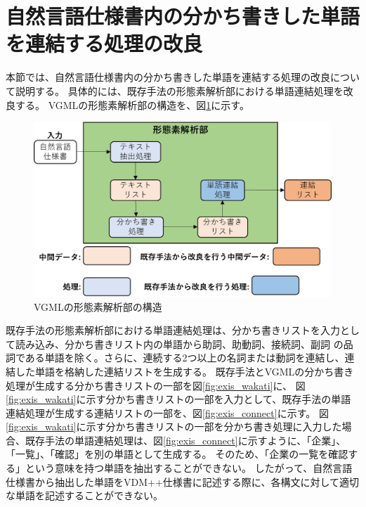 \section{自然言語仕様書内の分かち書きした単語を連結する処理の改良}
本節では、自然言語仕様書内の分かち書きした単語を連結する処理の改良について説明する。
具体的には、既存手法の形態素解析部における単語連結処理を改良する。
VGMLの形態素解析部の構造を、図\ref{fig:vgml_mor_structure}に示す。

\begin{figure}[t]
    \begin{center}
        \includegraphics[width=1.0\columnwidth]{image/vgml_mor_structure.png}
        \caption{VGMLの形態素解析部の構造}
        \label{fig:vgml_mor_structure}
    \end{center}
\end{figure}

既存手法の形態素解析部における単語連結処理は、分かち書きリストを入力として読み込み、分かち書きリスト内の単語から助詞、助動詞、接続詞、副詞
の品詞である単語を除く。さらに、連続する2つ以上の名詞または動詞を連結し、連結した単語を格納した連結リストを生成する。
既存手法とVGMLの分かち書き処理が生成する分かち書きリストの一部を図\ref{fig:exis_wakati}に、
図\ref{fig:exis_wakati}に示す分かち書きリストの一部を入力として、既存手法の単語連結処理が生成する連結リストの一部を、図\ref{fig:exis_connect}に示す。
図\ref{fig:exis_wakati}に示す分かち書きリストの一部を分かち書き処理に入力した場合、既存手法の単語連結処理は、図\ref{fig:exis_connect}に示すように、「企業」、「一覧」、「確認」を別の単語として生成する。
そのため、「企業の一覧を確認する」という意味を持つ単語を抽出することができない。
したがって、自然言語仕様書から抽出した単語をVDM++仕様書に記述する際に、各構文に対して適切な単語を記述することができない。

